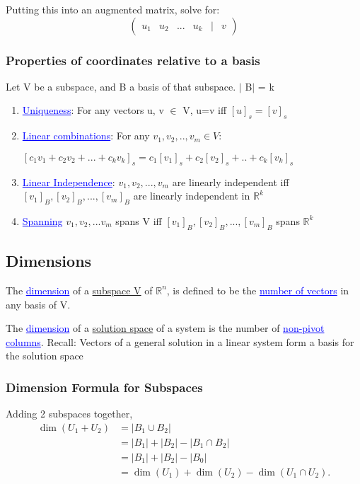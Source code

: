 \documentclass{article}
\newcommand{\bul}[1]{\textcolor{blue}{\underline{#1}}}
\newcommand{\sbreak}{\vspace{10pt}}
\begin{document}
Putting this into an augmented matrix, solve for:
\[
\begin{pmatrix}
    u_1 & u_2 & ... & u_k & | & v
\end{pmatrix}
\]

\subsubsection{Properties of coordinates relative to a basis}
Let V be a subspace, and B a basis of that subspace. $\mid$ B$\mid$ = k

\begin{enumerate}
    \item \bul{Uniqueness}: For any vectors u, v $\in$ V, u=v iff $[u]_s = [v]_s$
    \item \bul{Linear combinations}: For any $v_1,v_2,..,v_m \in V$:
    \begin{center}
        $[c_1v_1 + c_2v_2 + ... + c_kv_k]_s = c_1[v_1]_s +  c_2[v_2]_s + .. + c_k[v_k]_s$
    \end{center}
    \item \bul{Linear Independence}: $v_1, v_2, ..., v_m$ are linearly independent iff $[v_1]_B, [v_2]_B, ..., [v_m]_B$ are linearly independent in $\mathbb{R}^k$
    \item \bul{Spanning} {$v_1, v_2,... v_m$} spans V iff {$[v_1]_B, [v_2]_B,...,[v_m]_B$} spans $\mathbb{R}^k$
\end{enumerate}

\subsection{Dimensions}
The \bul{dimension} of a \underline{subspace V} of $\mathbb{R}^n$, is defined to be the \bul{number of vectors} in any basis of V.

\sbreak

The \bul{dimension} of a \underline{solution space} of a system is the number of \bul{non-pivot columns}. Recall: Vectors of a general solution in a linear system form a basis for the solution space

\subsubsection{Dimension Formula for Subspaces}
Adding 2 subspaces together,
\begin{align*}
    \dim(U_1 + U_2) &= |B_1 \cup B_2| \\
    &= |B_1| + |B_2| - |B_1 \cap B_2| \\
    &= |B_1| + |B_2| - |B_0| \\
    &= \dim(U_1) + \dim(U_2) - \dim(U_1 \cap U_2).
    \end{align*}
    
\end{document}
